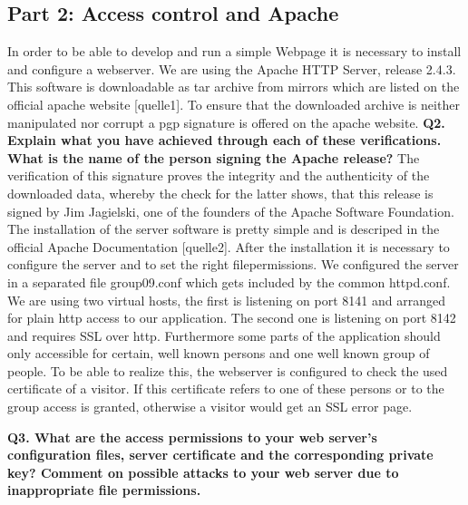 \subsection {Part 2: Access control and Apache}


\noindent
In order to be able to develop and run a simple Webpage it is necessary to install and configure a webserver. 
We are using  the Apache HTTP Server, release 2.4.3. This software is downloadable as tar archive from mirrors 
which are listed on the official apache website [quelle1]. To ensure that the downloaded archive is neither manipulated 
nor corrupt a pgp signature is offered on the apache website. 
\newline
\noindent
{\bf Q2. Explain what you have achieved through each of these verifications.
What is the name of the person signing the Apache release?}
\newline
\noindent
The verification of this signature proves the integrity and the authenticity of the downloaded data, 
whereby the check for the latter shows, that this release is signed by Jim Jagielski, 
one of the founders of the Apache Software Foundation. 
\newline
\noindent
The installation of the server software is pretty simple and is descriped in the official Apache Documentation [quelle2].
After the installation it is necessary to configure the server and to set the right filepermissions. 
We configured the server in a separated file group09.conf which gets included by the common httpd.conf. 
We are using two virtual hosts, the first is listening on port 8141 and arranged for plain http access to our application.
The second one is listening on port 8142 and requires SSL over http. 
Furthermore some parts of the application should only accessible for certain, 
well known persons and one well known group of people. To be able to realize this, 
the webserver is configured to check the used certificate of a visitor. 
If this certificate refers to one of these persons or to the group access is granted, 
otherwise a visitor would get an SSL error page. 
\newline

\noindent
{\bf Q3. What are the access permissions to your web server’s configuration files,
server certificate and the corresponding private key? Comment on possible
attacks to your web server due to inappropriate file permissions.}
\newline

